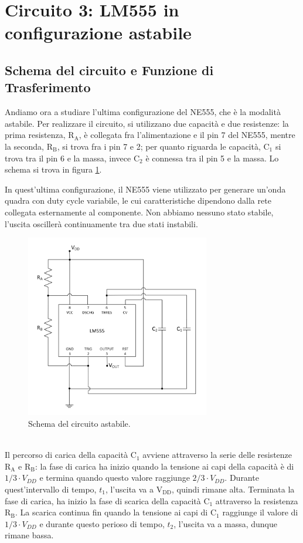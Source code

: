 \documentclass{report}
\begin{document}
\newpage
\section{Circuito 3: LM555 in configurazione astabile}
\subsection{Schema del circuito e Funzione di Trasferimento}
Andiamo ora a studiare l'ultima configurazione del NE555, che è la modalità astabile. Per realizzare il circuito, si utilizzano due capacità e due resistenze: la prima resistenza, $\mathrm{R_A}$, è collegata fra l'alimentazione e il pin 7 del NE555, mentre la seconda, $\mathrm{R_B}$, si trova fra i pin 7 e 2; per quanto riguarda le capacità, $\mathrm{C_1}$ si trova tra il pin 6 e la massa, invece $\mathrm{C_2}$ è connessa tra il pin 5 e la massa. Lo schema si trova in figura \ref{figura:schema3}. \par
In quest'ultima configurazione, il NE555 viene utilizzato per generare un'onda quadra con duty cycle variabile, le cui caratteristiche dipendono dalla rete collegata esternamente al componente. Non abbiamo nessuno stato stabile, l'uscita oscillerà continuamente tra due stati instabili.
\begin{figure}[h!]
	\centering
	\includegraphics[height=8cm]{immagini/schema3}
	\caption{Schema del circuito astabile.}
	\label{figura:schema3}
\end{figure}
\\Il percorso di carica della capacità $\mathrm{C_1}$ avviene attraverso la serie delle resistenze $\mathrm{R_A}$ e $\mathrm{R_B}$: la fase di carica ha inizio quando la tensione ai capi della capacità è di $1/3\cdot V_{DD}$ e termina quando questo valore raggiunge $2/3\cdot V_{DD}$. Durante quest'intervallo di tempo, $t_1$, l'uscita va a $\mathrm{V_{DD}}$, quindi rimane alta. Terminata la fase di carica, ha inizio la fase di scarica della capacità $\mathrm{C_1}$ attraverso la resistenza $\mathrm{R_B}$. La scarica continua fin quando la tensione ai capi di $\mathrm{C_1}$ raggiunge il valore di $1/3\cdot V_{DD}$ e durante questo perioso di tempo, $t_2$, l'uscita va a massa, dunque rimane bassa. 
\end{document}
